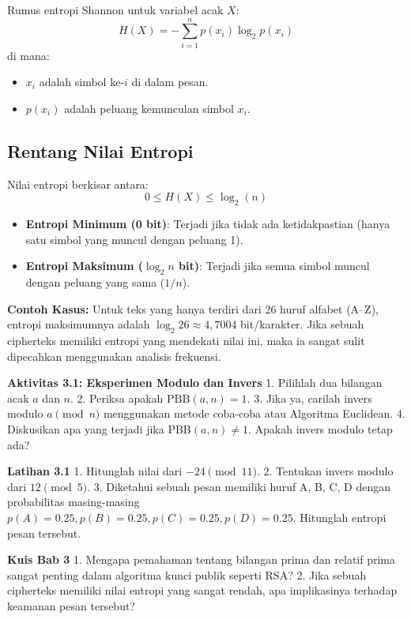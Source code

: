 \documentclass[../main.tex]{subfiles}
\begin{document}
Rumus entropi Shannon untuk variabel acak $X$:
\[ H(X) = - \sum_{i=1}^{n} p(x_i) \log_2 p(x_i) \]
di mana:
\begin{itemize}
    \item $x_i$ adalah simbol ke-$i$ di dalam pesan.
    \item $p(x_i)$ adalah peluang kemunculan simbol $x_i$.
\end{itemize}

\subsection{Rentang Nilai Entropi}
Nilai entropi berkisar antara:
\[ 0 \le H(X) \le \log_2(n) \]
\begin{itemize}
    \item \textbf{Entropi Minimum (0 bit)}: Terjadi jika tidak ada ketidakpastian (hanya satu simbol yang muncul dengan peluang 1).
    \item \textbf{Entropi Maksimum ($\log_2 n$ bit)}: Terjadi jika semua simbol muncul dengan peluang yang sama ($1/n$).
\end{itemize}

\textbf{Contoh Kasus:}
Untuk teks yang hanya terdiri dari 26 huruf alfabet (A--Z), entropi maksimumnya adalah $\log_2 26 \approx 4,7004$ bit/karakter. Jika sebuah cipherteks memiliki entropi yang mendekati nilai ini, maka ia sangat sulit dipecahkan menggunakan analisis frekuensi.

\begin{obeactivity}
\textbf{Aktivitas 3.1: Eksperimen Modulo dan Invers}
1. Pilihlah dua bilangan acak $a$ dan $n$.
2. Periksa apakah $\text{PBB}(a, n) = 1$.
3. Jika ya, carilah invers modulo $a \pmod{n}$ menggunakan metode coba-coba atau Algoritma Euclidean.
4. Diskusikan apa yang terjadi jika $\text{PBB}(a, n) \neq 1$. Apakah invers modulo tetap ada?
\end{obeactivity}

\begin{obereflection}
\textbf{Latihan 3.1}
1. Hitunglah nilai dari $-24 \pmod{11}$.
2. Tentukan invers modulo dari $12 \pmod{5}$.
3. Diketahui sebuah pesan memiliki huruf A, B, C, D dengan probabilitas masing-masing $p(A)=0.25, p(B)=0.25, p(C)=0.25, p(D)=0.25$. Hitunglah entropi pesan tersebut.
\end{obereflection}

\begin{obeassessment}
\textbf{Kuis Bab 3}
1. Mengapa pemahaman tentang bilangan prima dan relatif prima sangat penting dalam algoritma kunci publik seperti RSA?
2. Jika sebuah cipherteks memiliki nilai entropi yang sangat rendah, apa implikasinya terhadap keamanan pesan tersebut?
\end{obeassessment}
\end{document}
